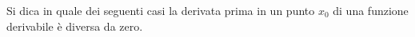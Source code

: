 Si dica in quale dei seguenti casi la derivata prima in un punto $x_0$
di una funzione derivabile è diversa da zero.
